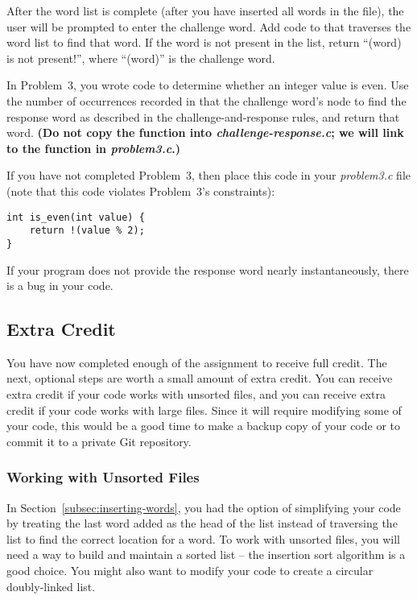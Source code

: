 

After the word list is complete (after you have inserted all words in the file), the user will be prompted to enter the challenge word.
Add code to  that traverses the word list to find that word.
If the word is not present in the list, return ``(word) is not present!'', where ``(word)'' is the challenge word.

In Problem~3, you wrote code to determine whether an integer value is even.
Use the number of occurrences recorded in that the challenge word's node to find the response word as described in the challenge-and-response rules, and return that word.
\textbf{(Do not copy the  function into \textit{challenge-response.c};
we will link to the function in \textit{problem3.c}.)}

If you have not completed Problem~3, then place this code in your \textit{problem3.c} file
(note that this code violates Problem~3's constraints):

\begin{lstlisting}
int is_even(int value) {
    return !(value % 2);
}
\end{lstlisting}

If your program does not provide the response word nearly instantaneously, there is a bug in your code.

\subsection*{Extra Credit}

You have now completed enough of the assignment to receive full credit.
The next, optional steps are worth a small amount of extra credit.
You can receive extra credit if your code works with unsorted files, and you can receive extra credit if your code works with large files.
Since it will require modifying some of your code, this would be a good time to make a backup copy of your code or to commit it to a private Git repository.

\subsubsection*{Working with Unsorted Files}

In Section~\ref{subsec:inserting-words}, you had the option of simplifying your code by treating the last word added as the head of the list instead of traversing the list to find the correct location for a word.
To work with unsorted files, you will need a way to build and maintain a sorted list -- the insertion sort algorithm is a good choice.
You might also want to modify your code to create a circular doubly-linked list.

